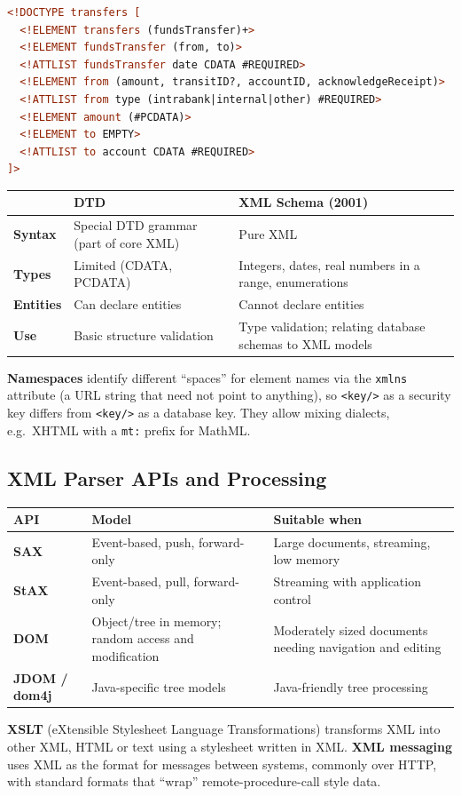 \begin{lstlisting}[language=XML]
<!DOCTYPE transfers [
  <!ELEMENT transfers (fundsTransfer)+>
  <!ELEMENT fundsTransfer (from, to)>
  <!ATTLIST fundsTransfer date CDATA #REQUIRED>
  <!ELEMENT from (amount, transitID?, accountID, acknowledgeReceipt)>
  <!ATTLIST from type (intrabank|internal|other) #REQUIRED>
  <!ELEMENT amount (#PCDATA)>
  <!ELEMENT to EMPTY>
  <!ATTLIST to account CDATA #REQUIRED>
]>
\end{lstlisting}

\begin{center}
\begin{tabularx}{\textwidth}{>{\bfseries}lXX}
\toprule
 & DTD & XML Schema (2001)\\
\midrule
Syntax & Special DTD grammar (part of core XML) & Pure XML\\
Types & Limited (CDATA, PCDATA) & Integers, dates, real numbers in a range, enumerations\\
Entities & Can declare entities & Cannot declare entities\\
Use & Basic structure validation & Type validation; relating database schemas to XML models\\
\bottomrule
\end{tabularx}
\end{center}

\textbf{Namespaces} identify different ``spaces'' for element names via the \texttt{xmlns} attribute (a URL string that
need not point to anything), so \verb|<key/>| as a security key differs from \verb|<key/>| as a database key. They
allow mixing dialects, e.g.\ XHTML with a \texttt{mt:} prefix for MathML.

\subsection{XML Parser APIs and Processing}
\begin{center}
\begin{tabularx}{\textwidth}{>{\bfseries}lXX}
\toprule
API & Model & Suitable when\\
\midrule
SAX & Event-based, push, forward-only & Large documents, streaming, low memory\\
StAX & Event-based, pull, forward-only & Streaming with application control\\
DOM & Object/tree in memory; random access and modification & Moderately sized documents needing navigation and
editing\\
JDOM / dom4j & Java-specific tree models & Java-friendly tree processing\\
\bottomrule
\end{tabularx}
\end{center}
\textbf{XSLT} (eXtensible Stylesheet Language Transformations) transforms XML into other XML, HTML or text using a
stylesheet written in XML. \textbf{XML messaging} uses XML as the format for messages between systems, commonly over
HTTP, with standard formats that ``wrap'' remote-procedure-call style data.

